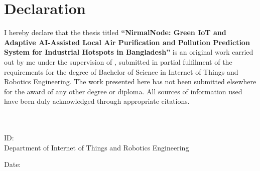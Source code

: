 \chapter*{Declaration}

I hereby declare that the thesis titled \textbf{``NirmalNode: Green IoT and Adaptive AI-Assisted Local Air Purification and Pollution Prediction System for Industrial Hotspots in Bangladesh''} is an original work carried out by me under the supervision of , submitted in partial fulfilment of the requirements for the degree of Bachelor of Science in Internet of Things and Robotics Engineering. The work presented here has not been submitted elsewhere for the award of any other degree or diploma. All sources of information used have been duly acknowledged through appropriate citations.

\vspace{2cm}
\noindent
\begin{minipage}{0.45\textwidth}
\\[0.6cm]
\\
ID: \\
Department of Internet of Things and Robotics Engineering
\end{minipage}

\vspace{1cm}
\noindent Date: 
